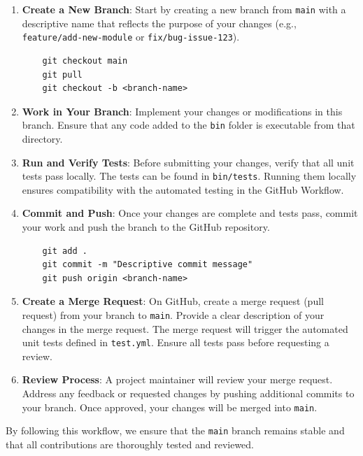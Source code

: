\begin{enumerate}
    \item \textbf{Create a New Branch}: Start by creating a new branch from \texttt{main} with a descriptive name that reflects the purpose of your changes (e.g., \texttt{feature/add-new-module} or \texttt{fix/bug-issue-123}).
    \begin{verbatim}
    git checkout main
    git pull
    git checkout -b <branch-name>
    \end{verbatim}

    \item \textbf{Work in Your Branch}: Implement your changes or modifications in this branch. Ensure that any code added to the \texttt{bin} folder is executable from that directory.

    \item \textbf{Run and Verify Tests}: Before submitting your changes, verify that all unit tests pass locally. The tests can be found in \texttt{bin/tests}. Running them locally ensures compatibility with the automated testing in the GitHub Workflow.

    \item \textbf{Commit and Push}: Once your changes are complete and tests pass, commit your work and push the branch to the GitHub repository.
    \begin{verbatim}
    git add .
    git commit -m "Descriptive commit message"
    git push origin <branch-name>
    \end{verbatim}

    \item \textbf{Create a Merge Request}: On GitHub, create a merge request (pull request) from your branch to \texttt{main}. Provide a clear description of your changes in the merge request. The merge request will trigger the automated unit tests defined in \texttt{test.yml}. Ensure all tests pass before requesting a review.

    \item \textbf{Review Process}: A project maintainer will review your merge request. Address any feedback or requested changes by pushing additional commits to your branch. Once approved, your changes will be merged into \texttt{main}.
\end{enumerate}

By following this workflow, we ensure that the \texttt{main} branch remains stable and that all contributions are thoroughly tested and reviewed.










